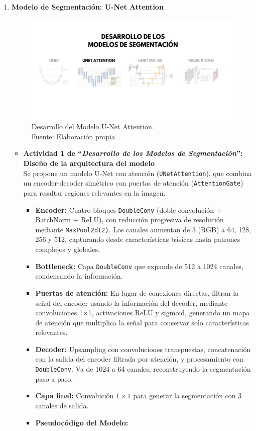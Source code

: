 \begin{enumerate}
  \newpage
  \item \textbf{Modelo de Segmentación: U-Net Attention}
  \begin{figure}[H]
	\begin{center}
		\includegraphics[width=1\textwidth]{4/figures/desunetat.png}
		\caption[Desarrollo del Modelo U-Net Attention]{Desarrollo del Modelo U-Net Attention.\\
		Fuente: Elaboración propia}
		\label{4:figdesunetat}
	\end{center}
\end{figure}
  \begin{itemize}


  \item\textbf{Actividad 1 de “\textit{Desarrollo de los Modelos de Segmentación}”: Diseño de la arquitectura del modelo}
\\
  Se propone un modelo U-Net con atención (\texttt{UNetAttention}), que combina un encoder-decoder simétrico con puertas de atención (\texttt{AttentionGate}) para resaltar regiones relevantes en la imagen.
\begin{itemize}
\item \textbf{Encoder:} Cuatro bloques \texttt{DoubleConv} (doble convolución + BatchNorm + ReLU), con reducción progresiva de resolución mediante \texttt{MaxPool2d(2)}. Los canales aumentan de 3 (RGB) a 64, 128, 256 y 512, capturando desde características básicas hasta patrones complejos y globales.
\item \textbf{Bottleneck:} Capa \texttt{DoubleConv} que expande de 512 a 1024 canales, condensando la información.
\item \textbf{Puertas de atención:} En lugar de conexiones directas, filtran la señal del encoder usando la información del decoder, mediante convoluciones 1×1, activaciones ReLU y sigmoid, generando un mapa de atención que multiplica la señal para conservar solo características relevantes.
\item \textbf{Decoder:} Upsampling con convoluciones transpuestas, concatenación con la salida del encoder filtrada por atención, y procesamiento con \texttt{DoubleConv}. Va de 1024 a 64 canales, reconstruyendo la segmentación paso a paso.
\item \textbf{Capa final:} Convolución $1\times1$ para generar la segmentación con 3 canales de salida.
\item \textbf{Pseudocódigo del Modelo:}




\end{itemize}
\end{itemize}
\end{enumerate}
